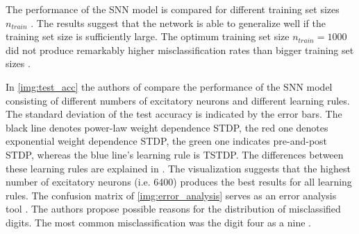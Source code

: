 The performance of the \ac{SNN} model is compared for different training set sizes $n_{train}$ \cite{STDP_like}.
The results suggest that the network is able to generalize well if the training set size is sufficiently large.
The optimum training set size $n_{train} = 1000$ did not produce remarkably higher misclassification rates than bigger training set sizes \cite{STDP_like}.


In \autoref{img:test_acc} the authors of \cite{SNN} compare the performance of the \ac{SNN} model consisting of different numbers of excitatory neurons 
and different learning rules.
The standard deviation of the test accuracy is indicated by the error bars.
The black line denotes power-law weight dependence \ac{STDP}, the red one denotes exponential weight dependence \ac{STDP}, 
the green one indicates pre-and-post \ac{STDP}, whereas the blue line's learning rule is \ac{TSTDP}.
The differences between these learning rules are explained in \cite{SNN}.
The visualization suggests that the highest number of excitatory neurons (i.e. 6400) produces the best results for all learning rules.
The confusion matrix of \autoref{img:error_analysis} serves as an error analysis tool \cite{SNN}.
The authors propose possible reasons for the distribution of misclassified digits.
The most common misclassification was the digit four as a nine \cite{SNN}.


